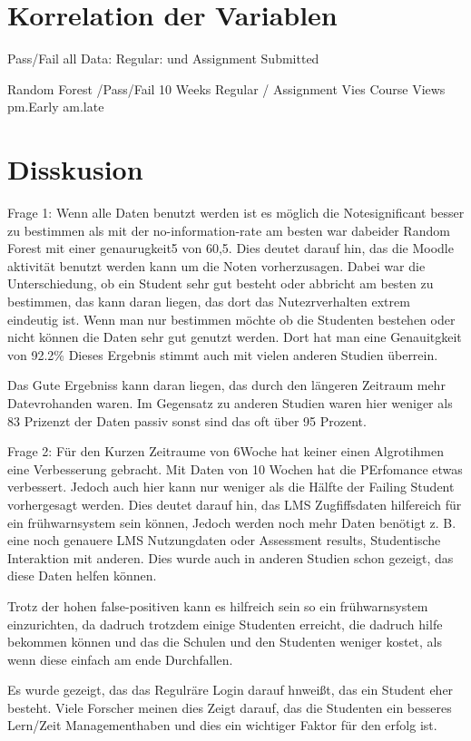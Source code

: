 \section{Korrelation der Variablen}

Pass/Fail all Data:
Regular: und Assignment Submitted


Random Forest /Pass/Fail 10 Weeks
Regular / Assignment Vies
Course Views
pm.Early
am.late


\section{Disskusion}
Frage 1: Wenn alle Daten benutzt werden ist es möglich die Notesignificant besser zu bestimmen als mit der no-information-rate 
am besten war dabeider Random Forest mit einer genaurugkeit5 von 60,5. Dies deutet darauf hin, das die Moodle aktivität benutzt werden kann um die Noten vorherzusagen.
Dabei war die Unterschiedung, ob ein Student sehr gut besteht oder abbricht am besten zu bestimmen, das kann daran liegen, das dort das Nutezrverhalten extrem eindeutig ist.
Wenn man nur bestimmen möchte ob die Studenten bestehen oder nicht können die Daten sehr gut genutzt werden. Dort hat man eine Genauitgkeit von 92.2\%
Dieses Ergebnis stimmt auch mit vielen anderen Studien überrein.

Das Gute Ergebniss kann daran liegen, das durch den längeren Zeitraum mehr Datevrohanden waren. Im Gegensatz zu anderen Studien waren hier weniger als 83 Prizenzt der Daten passiv sonst sind das oft über 95 Prozent.



Frage 2: Für den Kurzen Zeitraume von 6Woche  hat keiner einen Algrotihmen eine Verbesserung gebracht. Mit Daten von 10 Wochen hat die PErfomance etwas verbessert.
Jedoch auch hier kann nur weniger als die Hälfte der Failing Student vorhergesagt werden. Dies deutet darauf hin, das LMS Zugfiffsdaten hilfereich für ein frühwarnsystem sein können,
Jedoch werden noch mehr Daten benötigt z. B. eine noch genauere LMS Nutzungdaten oder Assessment results, Studentische Interaktion mit anderen. Dies wurde auch in anderen Studien schon gezeigt, das diese Daten helfen können.

Trotz der hohen false-positiven kann es hilfreich sein so ein frühwarnsystem einzurichten, da dadruch trotzdem einige Studenten erreicht, die dadruch hilfe bekommen können
und das die Schulen und den Studenten weniger kostet, als wenn diese einfach am ende Durchfallen.


Es wurde gezeigt, das das Regulräre Login darauf hnweißt, das ein Student eher besteht. Viele Forscher meinen dies Zeigt darauf, das die Studenten ein besseres Lern/Zeit Managementhaben und dies ein wichtiger Faktor für den erfolg ist.



